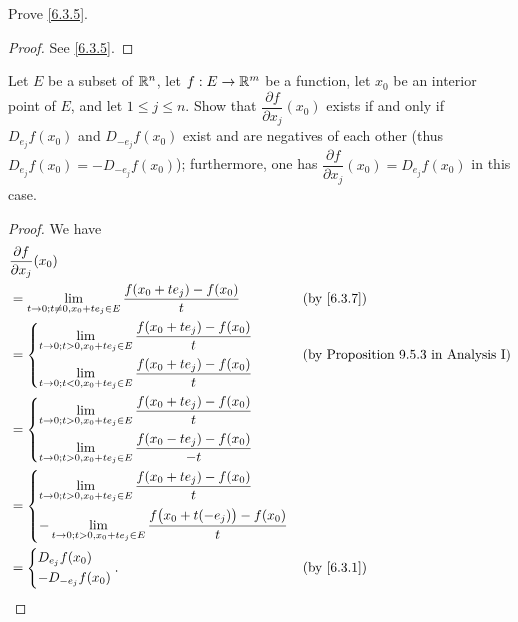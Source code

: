 \exercisesection

\begin{ex}\label{ex:6.3.1}
  Prove \cref{6.3.5}.
\end{ex}

\begin{proof}
  See \cref{6.3.5}.
\end{proof}

\begin{ex}\label{ex:6.3.2}
  Let \(E\) be a subset of \(\mathbb{R}^n\), let \(f : E \to \mathbb{R}^m\) be a function, let \(x_0\) be an interior point of \(E\), and let \(1 \leq j \leq n\).
  Show that \(\dfrac{\partial f}{\partial x_j}(x_0)\) exists if and only if \(D_{e_j} f(x_0)\) and \(D_{-e_j} f(x_0)\) exist and are negatives of each other
  (thus \(D_{e_j} f(x_0) = -D_{-e_j} f(x_0)\));
  furthermore, one has \(\dfrac{\partial f}{\partial x_j}(x_0) = D_{e_j} f(x_0)\) in this case.
\end{ex}

\begin{proof}
  We have
  \begin{align*}
     & \dfrac{\partial f}{\partial x_j}(x_0)                                                                    \\
     & = \lim_{t \to 0 ; t \neq 0, x_0 + t e_j \in E} \dfrac{f(x_0 + t e_j) - f(x_0)}{t}        &  & \by{6.3.7} \\
     & = \begin{dcases}
           \lim_{t \to 0 ; t > 0, x_0 + t e_j \in E} \dfrac{f(x_0 + t e_j) - f(x_0)}{t} \\
           \lim_{t \to 0 ; t < 0, x_0 + t e_j \in E} \dfrac{f(x_0 + t e_j) - f(x_0)}{t}
         \end{dcases}          &  & \text{(by Proposition 9.5.3 in Analysis I)}                           \\
     & = \begin{dcases}
           \lim_{t \to 0 ; t > 0, x_0 + t e_j \in E} \dfrac{f(x_0 + t e_j) - f(x_0)}{t} \\
           \lim_{t \to 0 ; t > 0, x_0 + t e_j \in E} \dfrac{f(x_0 - t e_j) - f(x_0)}{-t}
         \end{dcases}                           \\
     & = \begin{dcases}
           \lim_{t \to 0 ; t > 0, x_0 + t e_j \in E} \dfrac{f(x_0 + t e_j) - f(x_0)}{t} \\
           -\lim_{t \to 0 ; t > 0, x_0 + t e_j \in E} \dfrac{f\big(x_0 + t (-e_j)\big) - f(x_0)}{t}
         \end{dcases}                \\
     & = \begin{dcases}
           D_{e_j} f(x_0) \\
           - D_{-e_j} f(x_0)
         \end{dcases}.                                                                        &  & \by{6.3.1}
  \end{align*}
\end{proof}

